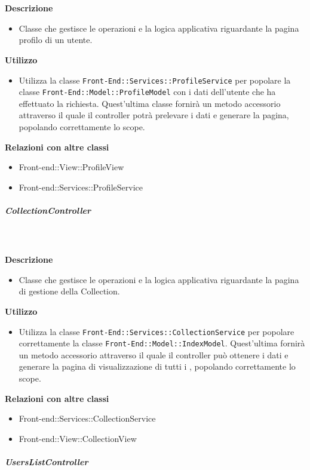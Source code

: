 				\textbf{\\ \\ Descrizione} 
					\begin{itemize}
						\item[] Classe che gestisce le operazioni e la logica applicativa riguardante la pagina profilo di un utente.
					\end{itemize}      
				\textbf{Utilizzo}  
					\begin{itemize}
						\item[] Utilizza la classe \texttt{Front-End::Services::ProfileService} per popolare la classe \texttt{Front-End::Model::ProfileModel} con i dati dell'utente che ha effettuato la richiesta. Quest'ultima classe fornirà un metodo accessorio attraverso il quale il controller potrà prelevare i dati e generare la pagina, popolando correttamente lo scope.
					\end{itemize}
					\textbf{Relazioni con altre classi}
					\begin{itemize}
							\item{Front-end::View::ProfileView}
							\item{Front-end::Services::ProfileService}
					\end{itemize}
			\subparagraph{CollectionController}
				
				\textbf{\\ \\ Descrizione} 
					\begin{itemize}
						\item[] Classe che gestisce le operazioni e la logica applicativa riguardante la pagina di gestione della Collection.
					\end{itemize}      
				\textbf{Utilizzo}  
					\begin{itemize}
						\item[] Utilizza la classe \texttt{Front-End::Services::CollectionService} per popolare correttamente la classe \texttt{Front-End::Model::IndexModel}. Quest'ultima fornirà un metodo accessorio attraverso il quale il controller può ottenere i dati e generare la pagina di visualizzazione di tutti i , popolando correttamente lo scope.
					\end{itemize}
					\textbf{Relazioni con altre classi}
					\begin{itemize}
							\item{Front-end::Services::CollectionService}
							\item{Front-end::View::CollectionView}
					\end{itemize}
			\subparagraph{UsersListController}
				
